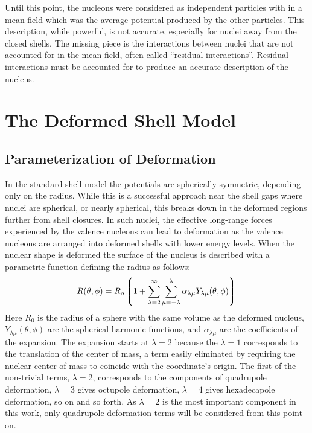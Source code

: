 Until this point, the nucleons were considered as independent particles with in a mean field which was the average potential produced by the other particles. This description, while powerful, is not accurate, especially for nuclei away from the closed shells. The missing piece is the interactions between nuclei that are not accounted for in the mean field, often called ``residual interactions''. Residual interactions must be accounted for to produce an accurate description of the nucleus.

\section{The Deformed Shell Model}
\label{ssec:models-shell-model-def-sm}
\subsection{Parameterization of Deformation}
In the standard shell model the potentials are spherically symmetric, depending only on the radius. While this is a successful approach near the shell gaps where nuclei are spherical, or nearly spherical, this breaks down in the deformed regions further from shell closures. In such nuclei, the effective long-range forces experienced by the valence nucleons can lead to deformation as the valence nucleons are arranged into deformed shells with lower energy levels. When the nuclear shape is deformed the surface of the nucleus is described with a parametric function defining the radius as follows:
\begin{equation}
\label{eqn:surface-full-expansion}
R(\theta, \phi) = R_{o}\left \lgroup 1 + \sum_{\lambda = 2}^{\infty}\sum_{\mu = -\lambda}^{\lambda}\alpha_{\lambda \mu} Y_{\lambda \mu}(\theta, \phi)\right \rgroup
\end{equation} 
Here $R_0$ is the radius of a sphere with the same volume as the deformed nucleus, $Y_{\lambda \mu}(\theta, \phi)$ are the spherical harmonic functions, and $\alpha_{\lambda \mu}$ are the coefficients of the expansion. The expansion starts at $\lambda = 2$ because the $\lambda = 1$ corresponds to the translation of the center of mass, a term easily eliminated by requiring the nuclear center of mass to coincide with the coordinate's origin. The first of the non-trivial terms, $\lambda = 2$, corresponds to the components of quadrupole deformation, $\lambda = 3$ gives octupole deformation, $\lambda = 4$ gives hexadecapole deformation, so on and so forth. As $\lambda = 2$ is the most important component in this work, only quadrupole deformation terms will be considered from this point on.


